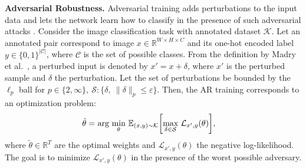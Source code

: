 {\bf Adversarial Robustness.}
Adversarial training adds perturbations to the input data and lets the network learn how to classify in the presence of such adversarial attacks \cite{goodfellow_2014_explaining,madry_2018_towards,athalye_2018_obfuscated}. Consider the image classification task with annotated dataset $\mathcal{K}$. Let an annotated pair correspond to image $x \in \mathbb{R}^{W\times H\times C}$ and its one-hot encoded label $y\in \{0,1\}^{|\mathcal{C}|}$, where $\mathcal{C}$ is the set of possible classes. From the definition by Madry et al.~\cite{madry_2018_towards}, a perturbed input is denoted by $x'=x+\delta$, where $x'$ is the perturbed sample and $\delta$ the perturbation. Let the set of perturbations be bounded by the $\ell_{p}$ ball for $p\in \{2,\infty\},\ \mathcal{S}:\{\delta,\ \|\delta\|_{p}\leq\varepsilon\}$. Then, the AR training corresponds to an optimization problem:
\vspace{-0.1cm}
\begin{align}
    \label{eq:robust01}
    \tilde{\theta}=&\ \text{arg }\underset{\theta}{\text{min}}\ \mathbb{E}_{(x,y)\sim \mathcal{K}}\bigg[\underset{\delta \in \mathcal{S}}{\text{max}}\ \mathcal{L}_{x', y}(\theta) \bigg],
    \vspace{-0.1cm}
\end{align}
where $\tilde{\theta}\in \mathbb{R}^{T}$ are the optimal weights and $\mathcal{L}_{x',y}(\theta)$ the negative log-likelihood. The goal is to minimize $\mathcal{L}_{x',y}(\theta)$ in the presence of the worst possible adversary.
